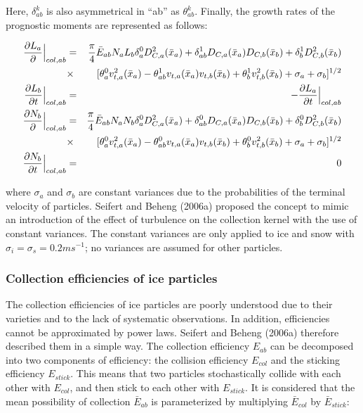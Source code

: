 Here, $\delta_{ab}^{k}$ is also asymmetrical in “ab” as $\theta_{ab}^{k}$. Finally, the growth rates of the prognostic moments are represented as follows:


\begin{eqnarray}
\frac{\partial L_{a}}{\partial }\Bigr|_{col,ab}&=&\frac{\pi}{4}\bar{E}_{ab}N_{a}L_{b}{\delta_{a}^{0}D_{C,a}^{2}(\bar{x}_{a})+\delta_{ab}^{1}D_{C,a}(\bar{x}_{a})D_{C,b}(\bar{x}_{b})+\delta_{b}^{1}D_{C,b}^{2}(\bar{x}_{b})}\nonumber\\
&\times&[\theta_{a}^{0}v_{t,a}^{2}(\bar{x}_{a})-\theta_{ab}^{1}v_{t,a}(\bar{x}_{a})v_{t,b}(\bar{x}_{b})+\theta_{b}^{1}v_{t,b}^{2}(\bar{x}_{b})+\sigma_{a}+\sigma_{b}]^{1/2}\label{sn176}\\
\frac{\partial L_{b}}{\partial t}\Bigr|_{col,ab}&=&-\frac{\partial L_{a}}{\partial t}\Bigl|_{col,ab}\label{sn177}\\
\frac{\partial N_{b}}{\partial }\Bigr|_{col,ab}&=&\frac{\pi}{4}\bar{E}_{ab}N_{a}N_{b}{\delta_{a}^{0}D_{C,a}^{2}(\bar{x}_{a})+\delta_{ab}^{0}D_{C,a}(\bar{x}_{a})D_{C,b}(\bar{x}_{b})+\delta_{b}^{0}D_{C,b}^{2}(\bar{x}_{b})}\nonumber\\
&\times&[\theta_{a}^{0}v_{t,a}^{2}(\bar{x}_{a})-\theta_{ab}^{0}v_{t,a}(\bar{x}_{a})v_{t,b}(\bar{x}_{b})+\theta_{b}^{0}v_{t,b}^{2}(\bar{x}_{b})+\sigma_{a}+\sigma_{b}]^{1/2}\label{sn178}\\
\frac{\partial N_{b}}{\partial t}\Bigr|_{col,ab}&=&0\label{sn179}
\end{eqnarray}

where $\sigma_{a}$ and $\sigma_{b}$ are constant variances due to the probabilities of the terminal velocity of particles. Seifert and Beheng (2006a) proposed the concept to mimic an introduction of the effect of turbulence on the collection kernel with the use of constant variances. The constant variances are only applied to ice and snow with $\sigma_{i}= \sigma_{s} = 0.2 m s^{-1}$; no variances are assumed for other particles.

\subsubsection{Collection efficiencies of ice particles}
The collection efficiencies of ice particles are poorly understood due to their varieties and to the lack of systematic observations. In addition, efficiencies cannot be approximated by power laws. Seifert and Beheng (2006a) therefore described them in a simple way. The collection efficiency $E_{ab}$ can be decomposed into two components of efficiency: the collision efficiency $E_{col}$ and the sticking efficiency $E_{stick}$. This means that two particles stochastically collide with each other with $E_{col}$, and then stick to each other with $E_{stick}$. It is considered that the mean possibility of collection $\bar{E}_{ab}$ is parameterized by multiplying $\bar{E}_{col}$ by $\bar{E}_{stick}$:

